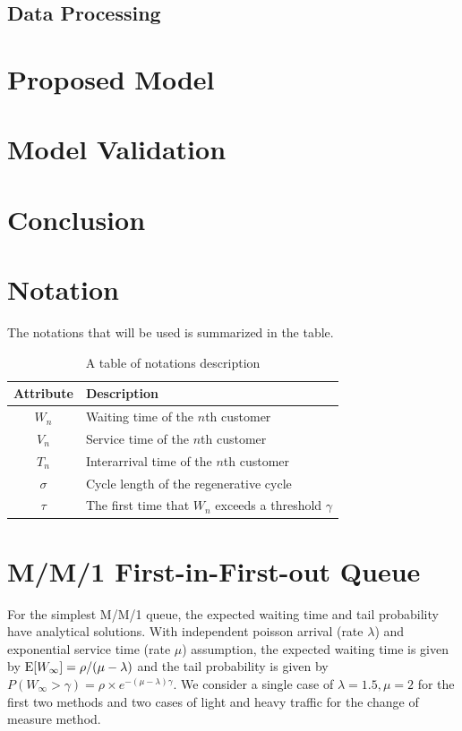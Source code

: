 \documentclass{article}
\begin{document}
\subsection{Data Processing}


\section{Proposed Model}



\section{Model Validation}



\section{Conclusion}


\section{Notation}
The notations that will be used is summarized in the table.
\begin{table}[!htbp]
    
	\centering
	\begin{tabularx}{0.55\textwidth}{cl}
		\toprule
        \textbf{Attribute}
		&  \textbf{Description} \\
		\midrule
		$W_n$ 
		& Waiting time of the $n$th customer 
		\\
		\midrule
		$V_n$ 
		& Service time of the $n$th customer
        \\
        \midrule
        $T_n$
        & Interarrival time of the $n$th customer
        \\
        \midrule
        $\sigma$
        & Cycle length of the regenerative cycle
        \\
        \midrule
        $\tau$
        & The first time that {$W_n$} exceeds a threshold $\gamma$
        \\
		\bottomrule
	\end{tabularx}%
	\label{tab:addlabel}%
	\caption{A table of notations description}
\end{table}%



\section{M/M/1 First-in-First-out Queue}
\label{sec:headings}
For the simplest M/M/1 queue, the expected waiting time and tail probability have analytical solutions. With independent poisson arrival (rate $\lambda$) and exponential service time (rate $\mu$) assumption, the expected waiting time is given by ${\rm E}[W_{\infty}]=\rho / (\mu - \lambda)$ and the tail probability is given by $P(W_{\infty}>\gamma)=\rho \times e^{-(\mu - \lambda)\gamma}$.
We consider a single case of $\lambda = 1.5,\mu = 2$ for the first two methods and two cases of light and heavy traffic for the change of measure method.
\end{document}
